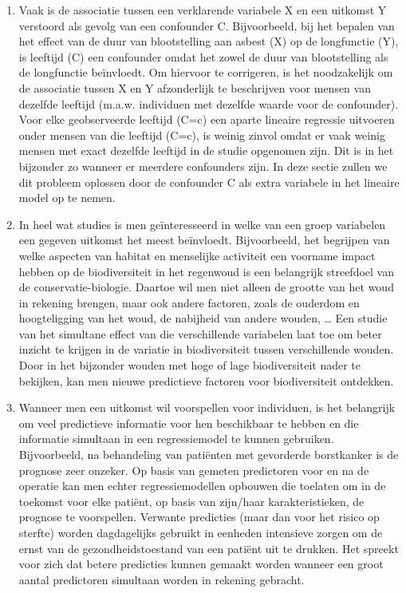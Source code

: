 \documentclass[
  12pt,dutch,coursenotes]{book}
\begin{document}
\begin{enumerate}
\def\labelenumi{\arabic{enumi}.}
\item
  Vaak is de associatie tussen een verklarende variabele X en een uitkomst Y verstoord als gevolg van een confounder C. Bijvoorbeeld, bij het bepalen van het effect van de duur van blootstelling aan asbest (X) op de longfunctie (Y), is leeftijd (C) een confounder omdat het zowel de duur van blootstelling als de longfunctie beïnvloedt. Om hiervoor te corrigeren, is het noodzakelijk om de associatie tussen X en Y afzonderlijk te beschrijven voor mensen van dezelfde leeftijd (m.a.w. individuen met dezelfde waarde voor de confounder). Voor elke geobserveerde leeftijd (C=c) een aparte lineaire regressie uitvoeren onder mensen van die leeftijd (C=c), is weinig zinvol omdat er vaak weinig mensen met exact dezelfde leeftijd in de studie opgenomen zijn. Dit is in het bijzonder zo wanneer er meerdere confounders zijn. In deze sectie zullen we dit probleem oplossen door de confounder C als extra variabele in het lineaire model op te nemen.
\item
  In heel wat studies is men geïnteresseerd in welke van een groep variabelen een gegeven uitkomst het meest beïnvloedt. Bijvoorbeeld, het begrijpen van welke aspecten van habitat en menselijke activiteit een voorname impact hebben op de biodiversiteit in het regenwoud is een belangrijk streefdoel van de conservatie-biologie. Daartoe wil men niet alleen de grootte van het woud in rekening brengen, maar ook andere factoren, zoals de ouderdom en hoogteligging van het woud, de nabijheid van andere wouden, \ldots{} Een studie van het simultane effect van die verschillende variabelen laat toe om beter inzicht te krijgen in de variatie in biodiversiteit tussen verschillende wouden. Door in het bijzonder wouden met hoge of lage biodiversiteit nader te bekijken, kan men nieuwe predictieve factoren voor biodiversiteit ontdekken.
\item
  Wanneer men een uitkomst wil voorspellen voor individuen, is het belangrijk om veel predictieve informatie voor hen beschikbaar te hebben en die informatie simultaan in een regressiemodel te kunnen gebruiken. Bijvoorbeeld, na behandeling van patiënten met gevorderde borstkanker is de prognose zeer onzeker. Op basis van gemeten predictoren voor en na de operatie kan men echter regressiemodellen opbouwen die toelaten om in de toekomst voor elke patiënt, op basis van zijn/haar karakteristieken, de prognose te voorspellen. Verwante predicties (maar dan voor het risico op sterfte) worden dagdagelijks gebruikt in eenheden intensieve zorgen om de ernst van de gezondheidstoestand van een patiënt uit te drukken. Het spreekt voor zich dat betere predicties kunnen gemaakt worden wanneer een groot aantal predictoren simultaan worden in rekening gebracht.
\end{enumerate}
\end{document}
